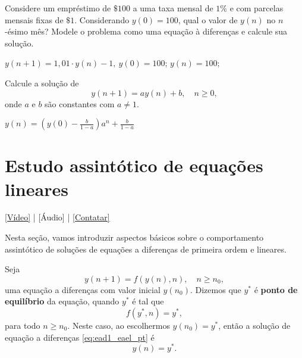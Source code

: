 \begin{exer}
  Considere um empréstimo de $\$ 100$ a uma taxa mensal de $1\%$ e com parcelas mensais fixas de $\$ 1$. Considerando $y(0)=100$, qual o valor de $y(n)$ no $n$-ésimo mês? Modele o problema como uma equação à diferenças e calcule sua solução.
\end{exer}
\begin{resp}
  $y(n+1)=1,01\cdot y(n)-1,~y(0)=100$; $y(n)=100$;
\end{resp}

\begin{exer}
  Calcule a solução de
  \begin{equation}
    y(n+1) = ay(n) + b,\quad n\geq 0,
  \end{equation}
  onde $a$ e $b$ são constantes com $a\neq 1$.
\end{exer}
\begin{resp}
  $\displaystyle y(n) = \left(y(0)-\frac{b}{1-a}\right)a^n + \frac{b}{1-a}$
\end{resp}

\section{Estudo assintótico de equações lineares}\label{cap_ead1_sec_eael}

\begin{flushright}
  \href{https://archive.org/details/ead-ponto-equilibrio}{[Vídeo]} | [Áudio] | \href{https://phkonzen.github.io/notas/contato.html}{[Contatar]}
\end{flushright}

Nesta seção, vamos introduzir aspectos básicos sobre o comportamento assintótico de soluções de equações a diferenças de primeira ordem e lineares.

Seja
\begin{equation}\label{eq:ead1_eael_pt}
  y(n+1) = f(y(n),n),\quad n\geq n_0,
\end{equation}
uma equação a diferenças com valor inicial $y(n_0)$. Dizemos que $y^*$ é {\bf ponto de equilíbrio} da equação, quando $y^*$ é tal que
\begin{equation}\label{eq:ead1_eael_eq}
  f(y^*,n) = y^*,
\end{equation}
para todo $n\geq n_0$.  Neste caso, ao escolhermos $y(n_0)=y^*$, então a solução de equação a diferenças \eqref{eq:ead1_eael_pt} é
\begin{equation}
  y(n) = y^*.
\end{equation}

